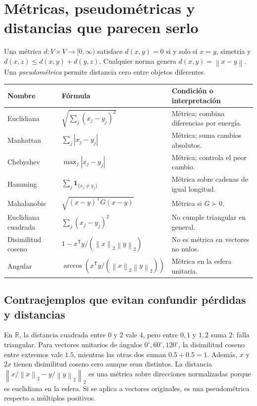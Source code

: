 \documentclass[11pt,a4paper]{article}
\newcommand{\R}{\mathbb R}
\newcommand{\ind}{\mathbf 1}
\newcommand{\T}{^{\mathsf T}}
\newcommand{\norm}[1]{\left\lVert #1\right\rVert}
\theoremstyle{definition}
\begin{document}
\section{Métricas, pseudométricas y distancias que parecen serlo}
Una métrica $d:V\times V\to[0,\infty)$ satisface $d(x,y)=0$ si y solo si $x=y$, simetría y $d(x,z)\le d(x,y)+d(y,z)$. Cualquier norma genera $d(x,y)=\norm{x-y}$. Una \emph{pseudométrica} permite distancia cero entre objetos diferentes.
\begin{center}\small
\begin{tabular}{>{\raggedright\arraybackslash}p{3.0cm}>{\raggedright\arraybackslash}p{6.3cm}>{\raggedright\arraybackslash}p{6.0cm}}\toprule
Nombre & Fórmula & Condición o interpretación\\\midrule
Euclidiana & $\sqrt{\sum_j(x_j-y_j)^2}$ & Métrica; combina diferencias por energía.\\
Manhattan & $\sum_j|x_j-y_j|$ & Métrica; suma cambios absolutos.\\
Chebyshev & $\max_j|x_j-y_j|$ & Métrica; controla el peor cambio.\\
Hamming & $\sum_j\ind_{\{x_j\ne y_j\}}$ & Métrica sobre cadenas de igual longitud.\\
Mahalanobis & $\sqrt{(x-y)\T G(x-y)}$ & Métrica si $G\succ0$.\\
Euclidiana cuadrada & $\sum_j(x_j-y_j)^2$ & No cumple triangular en general.\\
Disimilitud coseno & $1-x\T y/(\norm x_2\norm y_2)$ & No es métrica en vectores no nulos.\\
Angular & $\arccos(x\T y/(\norm x_2\norm y_2))$ & Métrica en la esfera unitaria.\\\bottomrule
\end{tabular}
\end{center}
\subsection{Contraejemplos que evitan confundir pérdidas y distancias}
En $\R$, la distancia cuadrada entre $0$ y $2$ vale $4$, pero entre $0,1$ y $1,2$ suma $2$: falla triangular. Para vectores unitarios de ángulos $0^\circ,60^\circ,120^\circ$, la disimilitud coseno entre extremos vale $1.5$, mientras las otras dos suman $0.5+0.5=1$. Además, $x$ y $2x$ tienen disimilitud coseno cero aunque sean distintos.
La distancia $\norm{x/\norm x_2-y/\norm y_2}_2$ es una métrica sobre direcciones normalizadas porque es euclidiana en la esfera. Si se aplica a vectores originales, es una pseudométrica respecto a múltiplos positivos.
\end{document}
